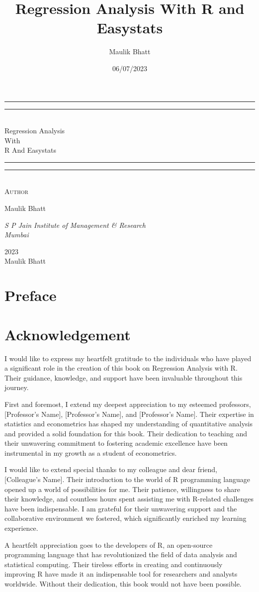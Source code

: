 \documentclass[
  letterpaper,
  paper =a4,
  twoside,
  openright,
  headsepline,
  footsepline,
  listof = totocnumbered,
  chapterprefix = true,
  firstiscover]{scrbook}
\title{Regression Analysis With R and Easystats}
\author{Maulik Bhatt}
\date{06/07/2023}
\renewcommand{\maketitle}{
\begin{titlepage}
		\pagecolor{myblue}
		\color{white}
	\centering
	\vspace*{\baselineskip}
	\rule{\textwidth}{1.6pt}\vspace*{-\baselineskip}\vspace*{2pt}
	\rule{\textwidth}{0.4pt}\\[\baselineskip]
	{\LARGE Regression Analysis\\ With \\[0.3\baselineskip] R And Easystats}\\[0.2\baselineskip]
	\rule{\textwidth}{0.4pt}\vspace*{-\baselineskip}\vspace{3.2pt}
	\rule{\textwidth}{1.6pt}\\[\baselineskip]
	\scshape
	\vspace*{8\baselineskip}
	Author \\[\baselineskip]
	{\Large Maulik Bhatt \par}
	{\itshape S P Jain Institute of Management \& Research \\ Mumbai\par}
	\vfill
	{\scshape 2023} \\
	{\large Maulik Bhatt}\par%

\end{titlepage}
\nopagecolor%
}
\renewcommand*\contentsname{Table of contents}
\newcommand\contentsname{Table of contents}
\begin{document}
\frontmatter
\maketitle
\renewcommand*\contentsname{Contents}
{
\hypersetup{linkcolor=}
\setcounter{tocdepth}{2}
\tableofcontents
}
\listoffigures
\listoftables
{}
\mainmatter
{}

\hypertarget{preface}{%
\chapter*{Preface}\label{preface}}



\hypertarget{acknowledgement}{%
\chapter*{Acknowledgement}\label{acknowledgement}}


I would like to express my heartfelt gratitude to the individuals who
have played a significant role in the creation of this book on
Regression Analysis with R. Their guidance, knowledge, and support have
been invaluable throughout this journey.

First and foremost, I extend my deepest appreciation to my esteemed
professors, {[}Professor's Name{]}, {[}Professor's Name{]}, and
{[}Professor's Name{]}. Their expertise in statistics and econometrics
has shaped my understanding of quantitative analysis and provided a
solid foundation for this book. Their dedication to teaching and their
unwavering commitment to fostering academic excellence have been
instrumental in my growth as a student of econometrics.

I would like to extend special thanks to my colleague and dear friend,
{[}Colleague's Name{]}. Their introduction to the world of R programming
language opened up a world of possibilities for me. Their patience,
willingness to share their knowledge, and countless hours spent
assisting me with R-related challenges have been indispensable. I am
grateful for their unwavering support and the collaborative environment
we fostered, which significantly enriched my learning experience.

A heartfelt appreciation goes to the developers of R, an open-source
programming language that has revolutionized the field of data analysis
and statistical computing. Their tireless efforts in creating and
continuously improving R have made it an indispensable tool for
researchers and analysts worldwide. Without their dedication, this book
would not have been possible.
\end{document}
